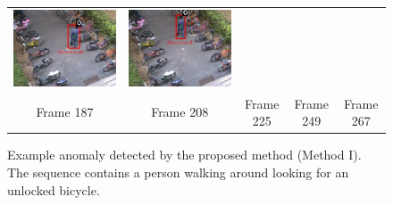 \begin{figure}[t]
\begin{tabular}{ccccc}
    \includegraphics[scale=0.21]{figures/case-1-suspicious-0249} &
    \includegraphics[scale=0.21]{figures/case-1-suspicious-0267}
    \\
    \small Frame 187 & 
    \small Frame 208 & 
    \small Frame 225 & 
    \small Frame 249 & 
    \small Frame 267
  \end{tabular}
  \caption[Example anomaly detected by the proposed method (Method
    I).]{\small Example anomaly detected by the proposed method
    (Method I). The sequence contains a person walking around looking
    for an unlocked bicycle.}
  \label{fig:suspicious-behavior-detected}
\end{figure}

